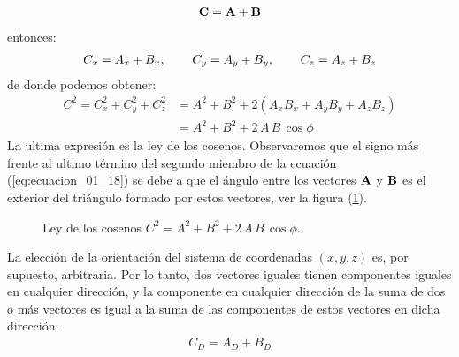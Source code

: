 \begin{align}
    \vb{C} = \vb{A} + \vb{B}
    \label{eq:ecuacion_01_16}
\end{align}
entonces:
\begin{align}
    C_{x} = A_{x} + B_{x}, \hspace{0.75cm} C_{y} = A_{y} + B_{y}, \hspace{0.75cm} C_{z} = A_{z} + B_{z} \label{eq:ecuacion_01_17}
\end{align}
de donde podemos obtener:
\begin{align}
    C^{2} = C_{x}^{2} + C_{y}^{2} + C_{z}^{2} &= A^{2} + B^{2} + 2 \left( A_{x} B_{x} + A_{y} B_{y} + A_{z} B_{z} \right) \nonumber \\[0.5em]
    &= A^{2} + B^{2} + 2 \, A \, B \, \cos \phi \label{eq:ecuacion_01_18}
\end{align}
La ultima expresión es la ley de los cosenos. Observaremos que el signo más frente al ultimo término del segundo miembro de la ecuación (\ref{eq:ecuacion_01_18}) se debe a que el ángulo entre los vectores $\vb{A}$ y $\vb{B}$ es el exterior del triángulo formado por estos vectores, ver la figura (\ref{fig:figura_01_09}). 
\begin{figure}[H]
    \centering
    \caption{Ley de los cosenos $C^{2} = A^{2} + B^{2} + 2 \, A \, B \, \cos \phi$.}
    \label{fig:figura_01_09}
\end{figure}
La elección de la orientación del sistema de coordenadas $(x, y, z)$ es, por supuesto, arbitraria. Por lo tanto, dos vectores iguales tienen componentes iguales en cualquier dirección, y la componente en cualquier dirección de la suma de dos o más vectores es igual a la suma de las componentes de estos vectores en dicha dirección:
\begin{align}
    C_{D} = A_{D} + B_{D}
    \label{eq:ecuacion_01_19}
\end{align}

